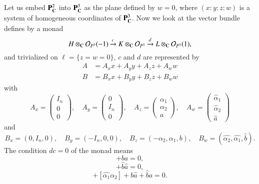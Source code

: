 Let us embed $\mathbf{P}_{\mathbf{C}}^{2}$ into $\mathbf{P}_{\mathbf{C}}^{3}$ as the plane defined by $w =0$, where $(x : y : z : w)$ is a system of homogeneous coordinates of $\mathbf{P}_{\mathbf{C}}^{3}$. Now we look at the vector bundle defines by a monad
$$
H \otimes_{\mathbf{C}} \mathcal{O}_{P^{3}}(-1) \xrightarrow{c} K \otimes_{\mathbf{C}}\mathcal{O}_{P^{3}} \xrightarrow{d} L \otimes_{\mathbf{C}}\mathcal{O}_{P^{3}}(1),
$$
and trivialized on $\ell =\{z=w=0\}$, $c$ and $d$ are represented by
\begin{align*}
A &= A_{x}x + A_{y}y + A_{z}z + A_{w}w\\
B &=B_{x}x + B_{y}y +B_{z}z+B_{w}w
\end{align*}
with
$$
A_{x} = \begin{pmatrix}
I_{n}\\
0\\
0
\end{pmatrix}
,\quad A_{y}=
\begin{pmatrix}
0\\
I_{n}\\
0
\end{pmatrix}
,\quad A_{z}=
\begin{pmatrix}
\alpha_{1}\\
\alpha_{2}\\
a
\end{pmatrix}
,\quad A_{w} =
\begin{pmatrix}
\hat{\alpha}_{1}\\
\hat{\alpha}_{2}\\
\hat{a}
\end{pmatrix}
$$
and
$$
B_{x}= (0,I_{n}, 0), \quad B_{y}=(-I_{n}, 0,0), \quad B_{z} =(-\alpha_{2}, \alpha_{1}, b), \quad B_{w} =(\hat{\alpha_{2}}, \hat{\alpha_{1}}, \hat{b}).
$$
The condition $dc =0$ of the monad means
\begin{equation*}
[\alpha_{1}, \alpha_{2}] +ba = 0,\tag{1.4.1}\label{chap12-eq-1.4.1}
\end{equation*}
\begin{equation*}
[\hat{\alpha_{1}}, \hat{\alpha_{2}}] +\hat{b}\hat{a} = 0,\tag{1.4.2}\label{chap12-eq-1.4.2}
\end{equation*}
\begin{equation*}
[\alpha_{1}, \hat{\alpha_{2}}] +[\hat{\alpha_{1}}\alpha_{2}] + b \hat{a}+ \hat{b}a = 0.\tag{1.4.3}\label{chap12-eq-1.4.3}
\end{equation*}\pageoriginale

